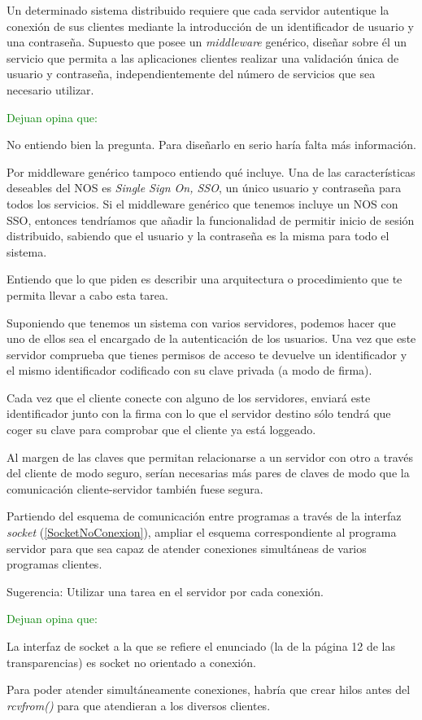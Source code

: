   \begin{problem}[5]
  Un determinado sistema distribuido requiere que cada servidor autentique
  la conexión de sus clientes mediante la introducción de un
  identificador de usuario y una contraseña. Supuesto que posee un
  \textit{middleware} genérico, diseñar sobre él un servicio que permita a las
aplicaciones clientes realizar una validación única de usuario y contraseña,
independientemente del número de servicios que sea necesario utilizar.
  \solution

\textcolor{green}{Dejuan opina que:}


No entiendo bien la pregunta. Para diseñarlo en serio haría falta más información.

Por middleware genérico tampoco entiendo qué incluye. Una de las características deseables del NOS es \textit{Single Sign On, SSO}, un único usuario y contraseña para todos los servicios. Si el middleware genérico que tenemos incluye un NOS con SSO, entonces tendríamos que añadir la funcionalidad de permitir inicio de sesión distribuido, sabiendo que el usuario y la contraseña es la misma para todo el sistema.

\yoP

Entiendo que lo que piden es describir una arquitectura o procedimiento que te permita llevar a cabo esta tarea.

Suponiendo que tenemos un sistema con varios servidores, podemos hacer que uno de ellos sea el encargado de la autenticación de los usuarios. Una vez que este servidor comprueba que tienes permisos de acceso te devuelve un identificador y el mismo identificador codificado con su clave privada (a modo de firma).

Cada vez que el cliente conecte con alguno de los servidores, enviará este identificador junto con la firma con lo que el servidor destino sólo tendrá que coger su clave para comprobar que el cliente ya está loggeado.

Al margen de las claves que permitan relacionarse a un servidor con otro a través del cliente de modo seguro, serían necesarias más pares de claves de modo que la comunicación cliente-servidor también fuese segura.
  \end{problem}

  \begin{problem}[6]
  Partiendo del esquema de comunicación entre programas a través de la
interfaz \textit{socket} (\ref{SocketNoConexion}), ampliar el esquema correspondiente al programa servidor para que sea capaz de atender conexiones simultáneas de varios programas clientes.

Sugerencia: Utilizar una tarea en el servidor por cada conexión.
  \solution

\textcolor{green}{Dejuan opina que:}

La interfaz de socket a la que se refiere el enunciado (la de la página 12 de las transparencias) es socket no orientado a conexión.

Para poder atender simultáneamente conexiones, habría que crear hilos antes del \textit{rcvfrom()} para que atendieran a los diversos clientes.


  \end{problem}

